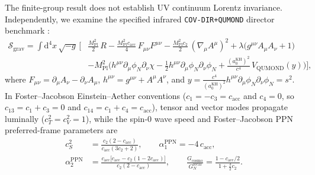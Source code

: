 \documentclass[11pt,a4paper]{article}
\begin{document}
The finite-group result does not establish UV continuum Lorentz
invariance. Independently, we examine the specified infrared
\texttt{COV-DIR+QUMOND} director benchmark \cite{Olcsak2026CovDir}:
\begin{equation}
\begin{aligned}
\mathcal{S}_{\mathrm{grav}} = \int\mathrm{d}^4x\,\sqrt{-g}\,\Biggl[
&\frac{M_{\mathrm{Pl}}^2}{2}\,R - \frac{M_{\mathrm{Pl}}^2 c_{\mathrm{acc}}}{4}\,F_{\mu\nu}F^{\mu\nu}
- \frac{M_{\mathrm{Pl}}^2 c_2}{2}\,(\nabla_\mu A^\mu)^2 + \lambda\bigl(g^{\mu\nu}A_\mu A_\nu + 1\bigr) \\
&- M_{\mathrm{Pl}}^2\Biggl(h^{\mu\nu}\partial_\mu\phi_N\partial_\nu\chi - \frac{1}{2}h^{\mu\nu}\partial_\mu\phi_N\partial_\nu\phi_N + \frac{(a_0^{\mathrm{KH}})^2}{c^4}\,V_{\mathrm{QUMOND}}(y)\Biggr)\Biggr],
\end{aligned}
\label{eq:covdir-action}
\end{equation}
where $F_{\mu\nu} = \partial_\mu A_\nu - \partial_\nu A_\mu$, $h^{\mu\nu} = g^{\mu\nu} + A^\mu A^\nu$, and $y = \frac{c^4}{(a_0^{\mathrm{KH}})^2}h^{\mu\nu}\partial_\mu\phi_N\partial_\nu\phi_N = s^2$. In Foster--Jacobson Einstein--Aether conventions ($c_1 = -c_3 = c_{\mathrm{acc}}$ and $c_4 = 0$, so $c_{13} = c_1 + c_3 = 0$ and $c_{14} = c_1 + c_4 = c_{\mathrm{acc}}$), tensor and vector modes propagate luminally ($c_T^2 = c_V^2 = 1$), while the spin-0 wave speed and Foster--Jacobson PPN preferred-frame parameters are \cite{FosterJacobson2006,OostMukohyamaWang2018,Will2014}
\begin{equation}
\begin{aligned}
c_S^2 &= \frac{c_2(2 - c_{\mathrm{acc}})}{c_{\mathrm{acc}}(3 c_2 + 2)}, \qquad
\alpha_1^{\mathrm{PPN}} = -4\,c_{\mathrm{acc}}, \\
\alpha_2^{\mathrm{PPN}} &= \frac{c_{\mathrm{acc}}\bigl[c_{\mathrm{acc}} - c_2(1 - 2 c_{\mathrm{acc}})\bigr]}{c_2(2 - c_{\mathrm{acc}})}, \qquad
\frac{G_{\mathrm{cosmo}}}{G_N^{\mathrm{local}}} = \frac{1 - c_{\mathrm{acc}}/2}{1 + \frac{3}{2}c_2}.
\end{aligned}
\label{eq:ppn-formulas}
\end{equation}
\end{document}
